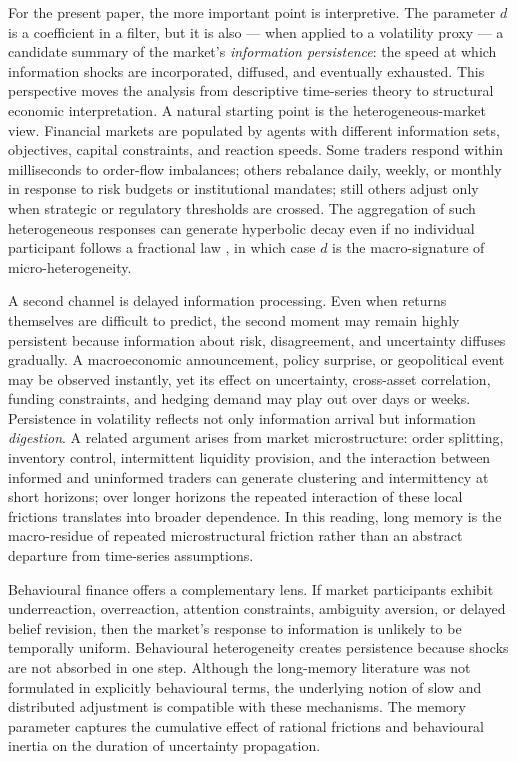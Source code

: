 \documentclass[11pt,a4paper]{article}
\begin{document}
For the present paper, the more important point is interpretive. The
parameter $d$ is a coefficient in a filter, but it is also --- when
applied to a volatility proxy --- a candidate summary of the market's
\emph{information persistence}: the speed at which information shocks are
incorporated, diffused, and eventually exhausted. This perspective moves
the analysis from descriptive time-series theory to structural economic
interpretation. A natural starting point is the heterogeneous-market view.
Financial markets are populated by agents with different information sets,
objectives, capital constraints, and reaction speeds. Some traders respond
within milliseconds to order-flow imbalances; others rebalance daily,
weekly, or monthly in response to risk budgets or institutional mandates;
still others adjust only when strategic or regulatory thresholds are
crossed. The aggregation of such heterogeneous responses can generate
hyperbolic decay even if no individual participant follows a fractional
law \citep{muller1997volatilities,corsi2009simple}, in which case $d$ is
the macro-signature of micro-heterogeneity.

A second channel is delayed information processing. Even when returns
themselves are difficult to predict, the second moment may remain highly
persistent because information about risk, disagreement, and uncertainty
diffuses gradually. A macroeconomic announcement, policy surprise, or
geopolitical event may be observed instantly, yet its effect on
uncertainty, cross-asset correlation, funding constraints, and hedging
demand may play out over days or weeks. Persistence in volatility
reflects not only information arrival but information \emph{digestion}.
A related argument arises from market microstructure: order splitting,
inventory control, intermittent liquidity provision, and the interaction
between informed and uninformed traders can generate clustering and
intermittency at short horizons; over longer horizons the repeated
interaction of these local frictions translates into broader dependence.
In this reading, long memory is the macro-residue of repeated
microstructural friction rather than an abstract departure from
time-series assumptions.

Behavioural finance offers a complementary lens. If market participants
exhibit underreaction, overreaction, attention constraints, ambiguity
aversion, or delayed belief revision, then the market's response to
information is unlikely to be temporally uniform. Behavioural heterogeneity
creates persistence because shocks are not absorbed in one step.
Although the long-memory literature was not formulated in explicitly
behavioural terms, the underlying notion of slow and distributed
adjustment is compatible with these mechanisms. The memory parameter
captures the cumulative effect of rational frictions and behavioural
inertia on the duration of uncertainty propagation.
\end{document}
